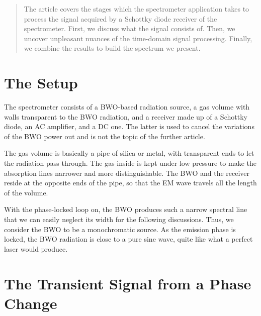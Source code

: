 \documentclass[a4paper]{article}
\begin{document}
\maketitle

\begin{abstract}
The article covers the stages which the spectrometer application takes to process the signal acquired by a Schottky diode receiver of the spectrometer. First, we discuss what the signal consists of. Then, we uncover unpleasant nuances of the time-domain signal processing. Finally, we combine the results to build the spectrum we present.
\end{abstract}

\section{The Setup}\label{sec:The Setup}

The spectrometer consists of a BWO-based radiation source, a gas volume with walls transparent to the BWO radiation, and a receiver made up of a Schottky diode, an AC amplifier, and a DC one. The latter is used to cancel the variations of the BWO power out and is not the topic of the further article.

The gas volume is basically a pipe of silica or metal, with transparent ends to let the radiation pass through. The gas inside is kept under low pressure to make the absorption lines narrower and more distinguishable. The BWO and the receiver reside at the opposite ends of the pipe, so that the EM wave travels all the length of the volume.

With the phase-locked loop on, the BWO produces such a narrow spectral line that we can easily neglect its width for the following discussions. Thus, we consider the BWO to be a monochromatic source. As the emission phase is locked, the BWO radiation is close to a pure sine wave, quite like what a perfect laser would produce.

\section{The Transient Signal from a Phase Change}\label{sec:The Transient Signal from a Phase Change}
\end{document}
